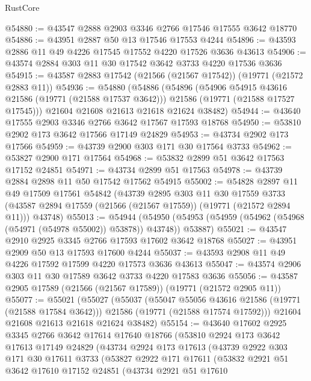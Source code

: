 \begin{lexlean}{RustCore}
\begin{coremodule}
@54880 := @43547 @2888 @2903 @3346 @2766 @17546 @17555 @3642 @18770
@54886 := @43951 @2887 @50 @13 @17546 @17553 @4244
@54896 := @43593 @2886 @11 @49 @4226 @17545 @17552 @4220 @17526 @3636 @43613
@54906 := @43574 @2884 @303 @11 @30 @17542 @3642 @3733 @4220 @17536 @3636
@54915 := @43587 @2883 @17542 (@21566 (@21567 @17542)) (@19771 (@21572 @2883 @11))
@54936 := @54880
    (@54886
      (@54896
        (@54906 @54915 @43616 @21586 (@19771 (@21588 @17537 @3642)))
        @21586
        (@19771 (@21588 @17527 @17545)))
      @21604
      @21608
      @21613
      @21618
      @21624
      @38482)
@54944 := @43640 @17555 @2903 @3346 @2766 @3642 @17567 @17593 @18768
@54950 := @53810 @2902 @173 @3642 @17566 @17149 @24829
@54953 := @43734 @2902 @173 @17566
@54959 := @43739 @2900 @303 @171 @30 @17564 @3733
@54962 := @53827 @2900 @171 @17564
@54968 := @53832 @2899 @51 @3642 @17563 @17152 @24851
@54971 := @43734 @2899 @51 @17563
@54978 := @43739 @2884 @2898 @11 @50 @17542 @17562 @54915
@55002 := @54828
    @2897
    @11
    @49
    @17509
    @17561
    @54842
    (@43739
      @2895
      @303
      @11
      @30
      @17559
      @3733
      (@43587 @2894 @17559 (@21566 (@21567 @17559)) (@19771 (@21572 @2894 @11)))
      @43748)
@55013 := @54944
    (@54950 (@54953 (@54959 (@54962 (@54968 (@54971 (@54978 @55002)) @53878)) @43748)) @53887)
@55021 := @43547 @2910 @2925 @3345 @2766 @17593 @17602 @3642 @18768
@55027 := @43951 @2909 @50 @13 @17593 @17600 @4244
@55037 := @43593 @2908 @11 @49 @4226 @17592 @17599 @4220 @17573 @3636 @43613
@55047 := @43574 @2906 @303 @11 @30 @17589 @3642 @3733 @4220 @17583 @3636
@55056 := @43587 @2905 @17589 (@21566 (@21567 @17589)) (@19771 (@21572 @2905 @11))
@55077 := @55021
    (@55027
      (@55037
        (@55047 @55056 @43616 @21586 (@19771 (@21588 @17584 @3642)))
        @21586
        (@19771 (@21588 @17574 @17592)))
      @21604
      @21608
      @21613
      @21618
      @21624
      @38482)
@55154 := @43640
    @17602
    @2925
    @3345
    @2766
    @3642
    @17614
    @17640
    @18766
    (@53810
      @2924
      @173
      @3642
      @17613
      @17149
      @24829
      (@43734
        @2924
        @173
        @17613
        (@43739
          @2922
          @303
          @171
          @30
          @17611
          @3733
          (@53827
            @2922
            @171
            @17611
            (@53832
              @2921
              @51
              @3642
              @17610
              @17152
              @24851
              (@43734
                @2921
                @51
                @17610

\end{coremodule}
\end{lexlean}

